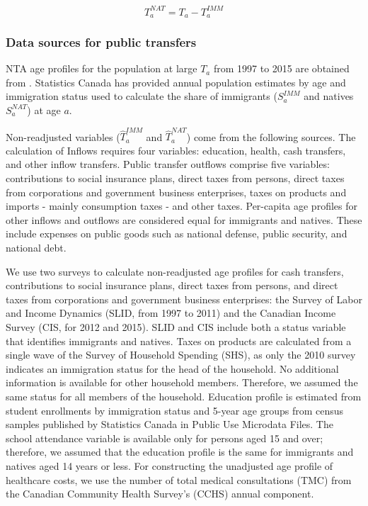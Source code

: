 \begin{equation}\label{eq:nat}
 {T}^{NAT}_a ={T}_a -{T}^{IMM}_a
\end{equation}

\subsubsection*{Data sources for public transfers}
NTA age profiles for the population at large \({T}_a \) from 1997 to 2015 are obtained from \citet{merettePopulationAgingCanada2019}.
Statistics Canada has provided annual population estimates by age and immigration status used to calculate the share of immigrants (\( S^{IMM}_a \) and natives \( S^{NAT}_a \)) at age \(a \).

\vspace{0.7em}\par
Non-readjusted variables (\(\hat{T}^{IMM}_a \) and \(\hat{T}^{NAT}_a \)) come from the following sources.
The calculation of Inflows requires four variables: education, health, cash transfers, and other inflow transfers.
Public transfer outflows comprise five variables: contributions to social insurance plans, direct taxes from persons, direct taxes from corporations and government business enterprises, taxes on products and imports - mainly consumption taxes - and other taxes.
Per-capita age profiles for other inflows and outflows are considered equal for immigrants and natives. These include expenses on public goods such as national defense, public security, and national debt.

\vspace{0.7em}\par
We use two surveys to calculate non-readjusted age profiles for cash transfers, contributions to social insurance plans, direct taxes from persons, and direct taxes from corporations and government business enterprises: the Survey of Labor and Income Dynamics (SLID, from 1997 to 2011) and the Canadian Income Survey (CIS, for 2012 and 2015).
SLID and CIS include both a status variable that identifies immigrants and natives.
Taxes on products are calculated from a single wave of the Survey of Household Spending (SHS), as only the 2010 survey indicates an immigration status for the head of the household.
No additional information is available for other household members.
Therefore, we assumed the same status for all members of the household.
Education profile is estimated from student enrollments by immigration status and 5-year age groups from census samples published by Statistics Canada in Public Use Microdata Files. The school attendance variable is available only for persons aged 15 and over; therefore, we assumed that the education profile is the same for immigrants and natives aged 14 years or less.
For constructing the unadjusted age profile of healthcare costs, we use the number of total medical consultations (TMC) from the Canadian Community Health Survey's (CCHS) annual component.


